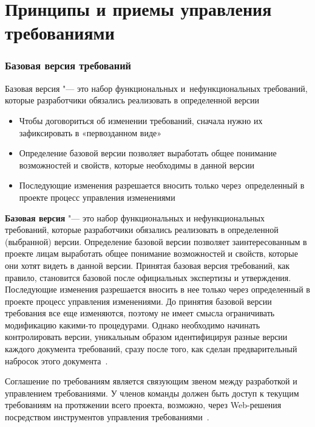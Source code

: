 \documentclass{../industrial-development}
\begin{document}
\section{Принципы и приемы управления требованиями}
\begin{frame} \frametitle{Базовая версия требований}
  \begin{block}{}
	\alert{Базовая версия} "--- это набор функциональных и~нефункциональных требований, которые разработчики обязались реализовать в определенной версии
  \end{block}	
	\begin{itemize}
\item Чтобы договориться об изменении требований, сначала нужно их зафиксировать в «первозданном виде»
\item Определение базовой версии позволяет выработать общее понимание возможностей и свойств, которые необходимы в данной версии
\item Последующие изменения разрешается вносить только через~определенный в проекте процесс управления изменениями
  	\end{itemize}
\end{frame}

\lecturenotes

\textbf{Базовая версия} "--- это набор функциональных и нефункциональных требований, которые разработчики обязались реализовать в определенной (выбранной) версии. Определение базовой версии позволяет заинтересованным в проекте лицам выработать общее понимание возможностей и свойств, которые они хотят видеть в данной версии. Принятая базовая версия требований, как правило, становится базовой после официальных экспертизы и утверждения. Последующие изменения разрешается вносить в нее только через определенный в проекте процесс управления изменениями. До принятия базовой версии требования все еще изменяются, поэтому не имеет смысла ограничивать модификацию какими-то процедурами. Однако необходимо начинать контролировать версии, уникальным образом идентифицируя разные версии каждого документа требований, сразу после того, как сделан предварительный набросок этого документа~\cite[с.~344]{Wiegers}. 

Соглашение по требованиям является связующим звеном между разработкой и управлением требованиями. У членов команды должен быть доступ к текущим требованиям на протяжении всего проекта, возможно, через Web-решения посредством инструментов управления требованиями~\cite[с.~342]{Wiegers}. 
\end{document}
